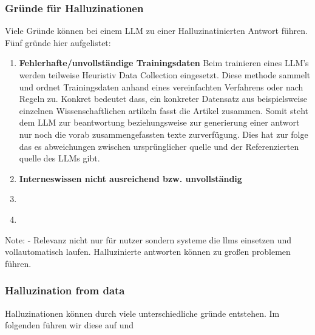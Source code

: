 \subsubsection{Gründe für Halluzinationen}
Viele Gründe können bei einem LLM zu einer Halluzinatinierten Antwort führen. Fünf gründe hier aufgelistet:

\begin{enumerate}
    \item \textbf{Fehlerhafte/unvollständige Trainingsdaten}
          Beim trainieren eines LLM's werden teilweise Heuristiv Data Collection eingesetzt. Diese methode sammelt und ordnet Trainingsdaten anhand eines vereinfachten Verfahrens oder nach Regeln zu.\autocite[5f]{jiSurveyHallucinationNatural2023} Konkret bedeutet dass, ein konkreter Datensatz aus beispielsweise einzelnen Wissenschaftlichen artikeln fasst die Artikel zusammen.
          Somit steht dem LLM zur beantwortung beziehungsweise zur generierung einer antwort nur noch die vorab zusammengefassten texte zurverfügung. Dies hat zur folge das es abweichungen zwischen ursprünglicher quelle und der Referenzierten quelle des LLMs gibt.\autocite[5f]{jiSurveyHallucinationNatural2023}
    \item \textbf{Interneswissen nicht ausreichend bzw. unvollständig}
    \item \textbf{}
    \item \textbf{}
\end{enumerate}


Note:
- Relevanz nicht nur für nutzer sondern systeme die llms einsetzen und vollautomatisch laufen. Halluzinierte antworten können zu großen problemen führen.

\subsubsection{Halluzination from data}
Halluzinationen können durch viele unterschiedliche gründe entstehen. Im folgenden führen wir diese auf und

